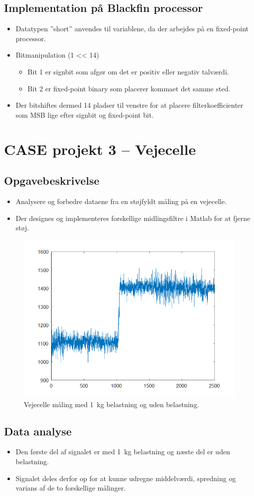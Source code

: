 \documentclass[danish]{article}
\begin{document}
\subsection{Implementation på Blackfin processor}
\begin{itemize}
	\item Datatypen ”short” anvendes til variablene, da der arbejdes på en fixed-point processor.
	\item Bitmanipulation (1 << 14)
	\begin{itemize}
		\item  Bit 1 er signbit som afgør om det er positiv eller negativ talværdi. 
		\item Bit 2 er fixed-point binary som placerer kommaet det samme sted.
	\end{itemize}
	\item Der bitshiftes dermed 14 pladser til venstre for at placere filterkoefficienter som MSB lige efter signbit og fixed-point bit.
\end{itemize}

\newpage
\section{CASE projekt 3 – Vejecelle}
\subsection{Opgavebeskrivelse}
\begin{itemize}
	\item Analysere og forbedre dataene fra en støjfyldt måling på en vejecelle.
	\item Der designes og implementeres forskellige midlingsfiltre i Matlab for at fjerne støj.
\end{itemize}

\begin{figure}[H]
	\centering
	\includegraphics[width=0.3\linewidth]{graphics/case3_1}
	\caption{Vejecelle måling med \SI{1}{\kilogram} belastning og  uden belastning.}
	\label{fig:case3_1}
\end{figure}

\subsection{Data analyse}
\begin{itemize}
	\item Den første del af signalet er med \SI{1}{\kilogram} belastning og næste del er uden belastning. 
	\item  Signalet deles derfor op for at kunne udregne middelværdi, spredning og varians af de to forskellige målinger.
\end{itemize} 
\end{document}

